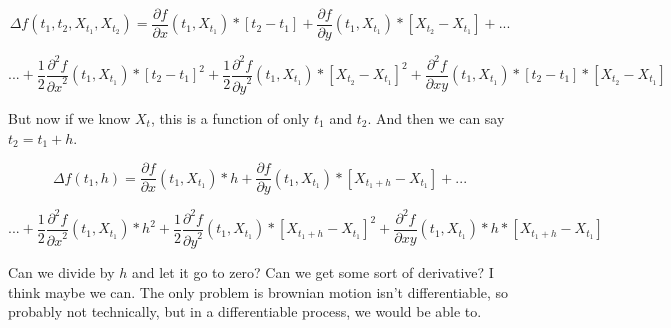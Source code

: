 \documentclass{article}
\begin{document}
$$\Delta f(t_1,t_2,X_{t_1},X_{t_2}) = \frac{\partial f}{\partial x}(t_1,X_{t_1}) *[t_2-t_1] + \frac{\partial f}{\partial y}(t_1,X_{t_1}) *[X_{t_2}-X_{t_1}]  + ... $$

$$... +  \frac{1}{2}\frac{\partial^2 f}{{\partial x}^2}(t_1,X_{t_1}) * {[t_2-t_1]}^2 + \frac{1}{2}\frac{\partial^2 f}{{\partial y}^2}(t_1,X_{t_1}) * {[X_{t_2}-X_{t_1}]}^2 +  \frac{\partial^2 f}{\partial xy}(t_1,X_{t_1}) *[t_2-t_1]*[X_{t_2}-X_{t_1}]$$

But now if we know $X_t$, this is a function of only $t_1$ and $t_2$.  And then we can say $t_2 = t_1 + h$.

$$\Delta f(t_1,h) = \frac{\partial f}{\partial x}(t_1,X_{t_1}) *h + \frac{\partial f}{\partial y}(t_1,X_{t_1}) *[X_{t_1+h}-X_{t_1}]  + ... $$

$$... +  \frac{1}{2}\frac{\partial^2 f}{{\partial x}^2}(t_1,X_{t_1}) * {h}^2 + \frac{1}{2}\frac{\partial^2 f}{{\partial y}^2}(t_1,X_{t_1}) * {[X_{t_1+h}-X_{t_1}]}^2 +  \frac{\partial^2 f}{\partial xy}(t_1,X_{t_1}) *h*[X_{t_1+h}-X_{t_1}]$$

Can we divide by $h$ and let it go to zero? Can we get some sort of derivative? I think maybe we can. The only problem is brownian motion isn't differentiable, so probably not technically, but in a differentiable process, we would be able to.
\end{document}
